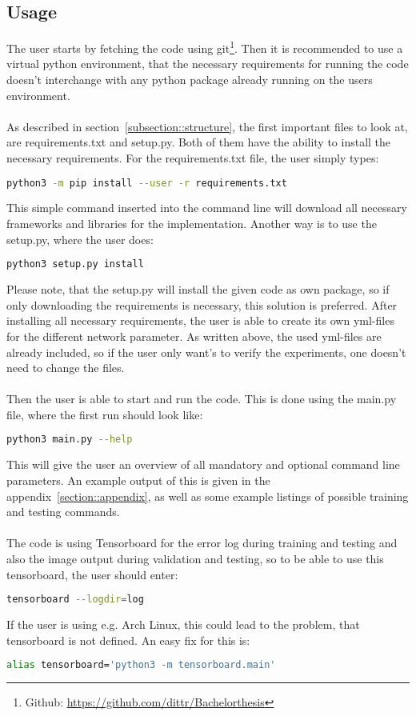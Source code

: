  \subsection{Usage}
  The user starts by fetching the code using git\footnote{Github: \href{https://github.com/dittr/Bachelorthesis}{https://github.com/dittr/Bachelorthesis}}.
  Then it is recommended to use a virtual python environment, that the necessary requirements for running the code doesn't interchange with any python package
  already running on the users environment.
  \\\\
  As described in section~\ref{subsection::structure}, the first important files to look at, are requirements.txt and setup.py. Both of them have the ability to
  install the necessary requirements. For the requirements.txt file, the user simply types:
  \begin{lstlisting}[language=bash]
   python3 -m pip install --user -r requirements.txt
  \end{lstlisting}\noindent
  This simple command inserted into the command line will download all necessary frameworks and libraries for the implementation.
  Another way is to use the setup.py, where the user does:
  \begin{lstlisting}[language=bash]
   python3 setup.py install
  \end{lstlisting}\noindent
  Please note, that the setup.py will install the given code as own package, so if only downloading the requirements is necessary, this solution is preferred.
  After installing all necessary requirements, the user is able to create its own yml-files for the different network parameter.
  As written above, the used yml-files are already included, so if the user only want's to verify the experiments, one doesn't need to change the files.
  \\\\
  Then the user is able to start and run the code.
  This is done using the main.py file, where the first run should look like:
  \begin{lstlisting}[language=bash]
   python3 main.py --help
  \end{lstlisting}\noindent
  This will give the user an overview of all mandatory and optional command line parameters. An example output of this is given in the 
  appendix~\ref{section::appendix}, as well as some example listings of possible training and testing commands.
  \\\\
  The code is using Tensorboard for the error log during training and testing and also the image output during validation and testing, so to be able to use
  this tensorboard, the user should enter:
  \begin{lstlisting}[language=bash]
   tensorboard --logdir=log
  \end{lstlisting}\noindent
  If the user is using e.g. Arch Linux, this could lead to the problem, that tensorboard is not defined. An easy fix for this is:
  \begin{lstlisting}[language=bash]
   alias tensorboard='python3 -m tensorboard.main'
  \end{lstlisting}\noindent